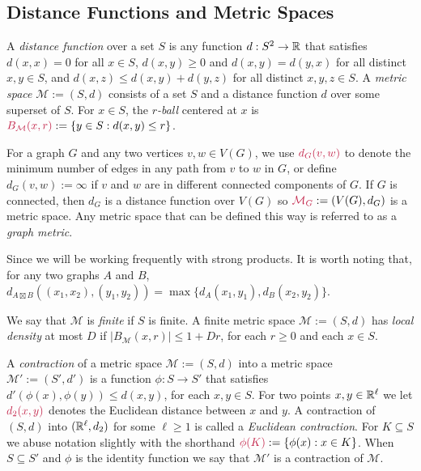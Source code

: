 \documentclass{patmorin}
\makeatletter
\newcommand{\defin}[1]{\emph{\textcolor{brightmaroon}{#1}}}
\def\mathcolor#1#{\@mathcolor{#1}}
\def\@mathcolor#1#2#3{%
  \protect\leavevmode
  \begingroup
    \color#1{#2}#3%
  \endgroup
}
\newcommand{\mathdefin}[1]{\mathcolor{brightmaroon}{#1}}
\makeatother
\begin{document}
\subsection{Distance Functions and Metric Spaces}

A \defin{distance function} over a set $S$ is any function $d:S^2\to\mathbb{R}$ that satisfies $d(x,x)=0$ for all $x\in S$, $d(x,y)\ge 0$ and $d(x,y)=d(y,x)$ for all distinct $x,y\in S$, and $d(x,z) \le d(x,y)+d(y,z)$ for all distinct $x,y,z\in S$.  A \defin{metric space} $\mathcal{M}:=(S,d)$ consists of a set $S$ and a distance function $d$ over some superset of $S$.  For $x\in S$, the \defin{$r$-ball} centered at $x$ is $\mathdefin{B_{\mathcal{M}}(x,r)}:=\{y\in S:d(x,y)\le r\}$.

For a graph $G$ and any two vertices $v,w\in V(G)$, we use $\mathdefin{d_G(v,w)}$ to denote the minimum number of edges in any path from $v$ to $w$ in $G$, or define $d_G(v,w):=\infty$ if $v$ and $w$ are in different connected components of $G$.  If $G$ is connected, then $d_G$ is a distance function over $V(G)$ so $\mathdefin{\mathcal{M}_G}:=(V(G),d_G)$ is a metric space. Any metric space that can be defined this way is referred to as a \defin{graph metric}.


Since we will be working frequently with strong products. It is worth noting that, for any two graphs $A$ and $B$, $d_{A\boxtimes B}((x_1,x_2),(y_1,y_2))=\max\{d_A(x_1,y_1),d_B(x_2,y_2)\}$.

We say that $\mathcal{M}$ is \defin{finite} if $S$ is finite.  A finite metric space $\mathcal{M}:=(S,d)$ has \defin{local density} at most $D$ if $|B_\mathcal{M}(x,r)|\le 1+Dr$, for each $r\ge 0$ and each $x\in S$.  

A \defin{contraction} of a metric space $\mathcal{M}:=(S,d)$ into a metric space $\mathcal{M'}:=(S',d')$ is a function $\phi:S\to S'$ that satisfies $d'(\phi(x),\phi(y))\le d(x,y)$, for each $x,y\in S$.  For two points $x,y\in\mathbb{R}^\ell$ we let $\mathdefin{d_2(x,y)}$ denotes the Euclidean distance between $x$ and $y$.  A contraction of $(S,d)$ into $(\mathbb{R}^\ell, d_2)$ for some $\ell\ge 1$ is called a \defin{Euclidean contraction}.  For $K\subseteq S$ we abuse notation slightly with the shorthand $\mathdefin{\phi(K)}:=\{\phi(x):x\in K\}$.  When $S\subseteq S'$ and $\phi$ is the identity function we say that $\mathcal{M'}$ is a contraction of $\mathcal{M}$.
\end{document}

